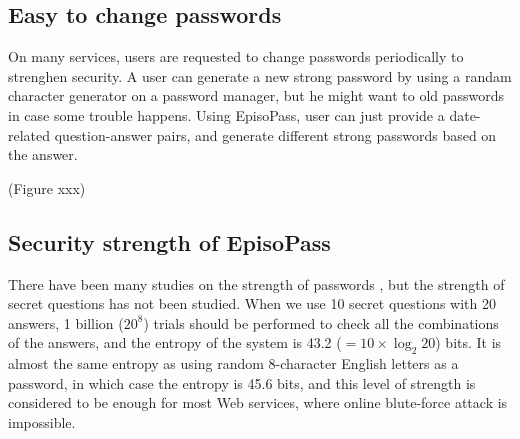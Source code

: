\documentclass{article}
\begin{document}

\subsection{Easy to change passwords}


On many services, users are requested to change passwords periodically
to strenghen security.
A user can generate a new strong password by using a randam character generator
on a password manager, but he might want to old passwords in case some trouble happens.
Using EpisoPass, user can just provide a date-related question-answer pairs,
and generate different strong passwords based on the answer.

(Figure xxx)

\subsection{Security strength of EpisoPass}

There have been many studies on the strength of passwords
\cite{Hayashi:2011:DSP:1978942.1979326}%
\cite{Komanduri:2011:PPM:1978942.1979321},%
but the strength of secret questions has not been studied.
%
%
When we use 10 secret questions with 20 answers,
1 billion ($20^8$) trials should be performed to check
all the combinations of the answers,
and the entropy of the system is 43.2 ($ = 10 \times \log_2 20$) bits.  %
%
%
It is almost the same entropy as using random 8-character English letters
as a password, in which case the entropy is 45.6 bits, 
and this level of strength is considered to be enough for most Web services,
where online blute-force attack is impossible\cite{Florencio:2007:SWP:1361419.1361429}.

\end{document}
